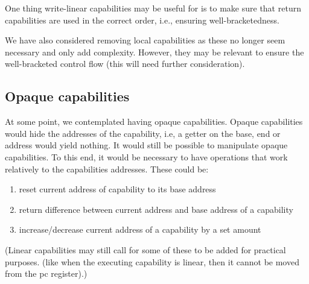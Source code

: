 \documentclass[a4paper]{article}
\begin{document}
One thing write-linear capabilities may be useful for is to make sure that return capabilities are used in the correct order, i.e., ensuring well-bracketedness. 

We have also considered removing local capabilities as these no longer seem necessary and only add complexity. However, they may be relevant to ensure the well-bracketed control flow (this will need further consideration).



\subsection{Opaque capabilities}
At some point, we contemplated having opaque capabilities. Opaque capabilities would hide the addresses of the capability, i.e, a getter on the base, end or address would yield nothing. It would still be possible to manipulate opaque capabilities. To this end, it would be necessary to have operations that work relatively to the capabilities addresses. These could be: 
\begin{enumerate}
\item reset current address of capability to its base address
\item return difference between current address and base address of a capability
\item increase/decrease current address of a capability by a set amount
\end{enumerate}
(Linear capabilities may still call for some of these to be added for practical purposes. (like when the executing capability is linear, then it cannot be moved from the pc register).)
\end{document}
